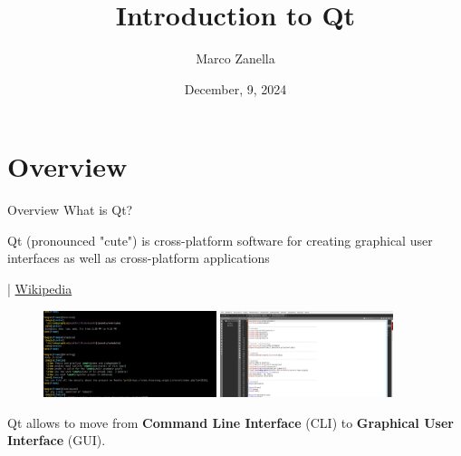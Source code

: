 \documentclass[11pt]{beamer}
\author{Marco Zanella}
\title{Introduction to Qt}
\institute{University of Padova}
\date{December, 9, 2024}
\renewcommand{\emph}[1]{\textbf{#1}}
\begin{document}
\begin{frame}
 \titlepage
\end{frame}

\begin{frame}
 \tableofcontents
\end{frame}


\section{Overview}
\begin{frame}{Overview}
 What is Qt?
 \begin{displayquote}
  Qt (pronounced "cute") is cross-platform software for creating graphical user interfaces as well as cross-platform applications
  \begin{flushright}
  | \href{https://en.wikipedia.org/wiki/Qt_(software)}{Wikipedia}
  \end{flushright}
 \end{displayquote}
 
 \begin{figure}
  \includegraphics[width=0.45\textwidth]{assets/figure-cli}
  \includegraphics[width=0.45\textwidth]{assets/figure-gui}
 \end{figure}
 Qt allows to move from \emph{Command Line Interface} (CLI) to \emph{Graphical User Interface} (GUI).
\end{frame}
\end{document}
